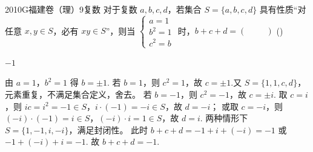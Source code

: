 
\begin{problem}{2010}{G}{福建卷（理）}{9}{复数}
对于复数 $ a,b,c,d $，若集合 $ S=\{a,b,c,d\} $ 具有性质“对任意 $ x,y\in S $，必有 $ xy\in S $”，则当 $ \begin{cases} a=1 \\ b^2=1 \\ c^2=b \end{cases} $ 时，$ b+c+d=(\hspace{1cm}) $ (\hspace{1cm})
\begin{choices}
\end{choices}
\end{problem}

\begin{answer}
$-1$
\end{answer}

\begin{solutions}
由 $ a=1 $，$ b^2=1 $ 得 $ b=\pm1 $.  
若 $ b=1 $，则 $ c^2=1 $，故 $ c=\pm1 $.又 $ S=\{1,1,c,d\} $，元素重复，不满足集合定义，舍去。  
若 $ b=-1 $，则 $ c^2=-1 $，故 $ c=\pm i $.  
取 $ c=i $，则 $ ic=i^2=-1\in S $，$ i\cdot(-1)=-i\in S $，故 $ d=-i $；  
或取 $ c=-i $，则 $ (-i)\cdot(-1)=i\in S $，$ (-i)\cdot i=1\in S $，故 $ d=i $.  
两种情形下 $ S=\{1,-1,i,-i\} $，满足封闭性。  
此时 $ b+c+d=-1+i+(-i)=-1 $ 或 $ -1+(-i)+i=-1 $.  
故 $ b+c+d=-1 $.
\end{solutions}
